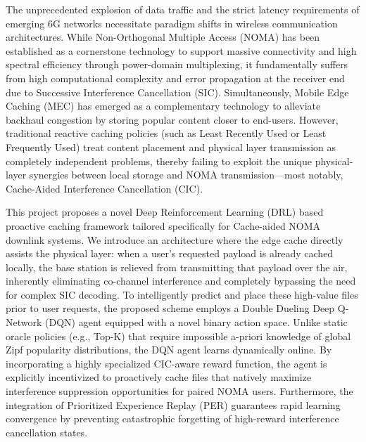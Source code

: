 \documentclass[12pt,a4paper]{article}
\begin{document}
\begin{singlespace}
\noindent
The unprecedented explosion of data traffic and the strict latency requirements of emerging 6G networks necessitate paradigm shifts in wireless communication architectures. While Non-Orthogonal Multiple Access (NOMA) has been established as a cornerstone technology to support massive connectivity and high spectral efficiency through power-domain multiplexing, it fundamentally suffers from high computational complexity and error propagation at the receiver end due to Successive Interference Cancellation (SIC). Simultaneously, Mobile Edge Caching (MEC) has emerged as a complementary technology to alleviate backhaul congestion by storing popular content closer to end-users. However, traditional reactive caching policies (such as Least Recently Used or Least Frequently Used) treat content placement and physical layer transmission as completely independent problems, thereby failing to exploit the unique physical-layer synergies between local storage and NOMA transmission—most notably, Cache-Aided Interference Cancellation (CIC).

This project proposes a novel Deep Reinforcement Learning (DRL) based proactive caching framework tailored specifically for Cache-aided NOMA downlink systems. We introduce an architecture where the edge cache directly assists the physical layer: when a user's requested payload is already cached locally, the base station is relieved from transmitting that payload over the air, inherently eliminating co-channel interference and completely bypassing the need for complex SIC decoding. To intelligently predict and place these high-value files prior to user requests, the proposed scheme employs a Double Dueling Deep Q-Network (DQN) agent equipped with a novel binary action space. Unlike static oracle policies (e.g., Top-K) that require impossible a-priori knowledge of global Zipf popularity distributions, the DQN agent learns dynamically online. By incorporating a highly specialized CIC-aware reward function, the agent is explicitly incentivized to proactively cache files that natively maximize interference suppression opportunities for paired NOMA users. Furthermore, the integration of Prioritized Experience Replay (PER) guarantees rapid learning convergence by preventing catastrophic forgetting of high-reward interference cancellation states.


\end{singlespace}
\end{document}
